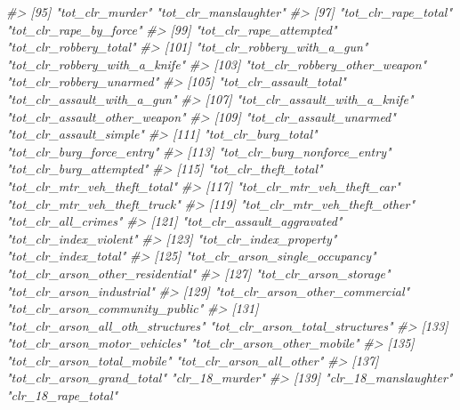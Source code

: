 \documentclass[
]{krantz}
\makeatletter
\newenvironment{Shaded}{\begin{snugshade}}{\end{snugshade}}
\newcommand{\CommentTok}[1]{\textcolor[rgb]{0.37,0.37,0.37}{\textit{#1}}}
\newenvironment{kframe}{%
\medskip{}
\setlength{\fboxsep}{.8em}
 \def\at@end@of@kframe{}%
 \ifinner\ifhmode%
  \def\at@end@of@kframe{\end{minipage}}%
  \begin{minipage}{\columnwidth}%
 \fi\fi%
 \def\FrameCommand##1{\hskip\@totalleftmargin \hskip-\fboxsep
 \colorbox{shadecolor}{##1}\hskip-\fboxsep
     \hskip-\linewidth \hskip-\@totalleftmargin \hskip\columnwidth}%
 \MakeFramed {\advance\hsize-\width
   \@totalleftmargin\z@ \linewidth\hsize
   \@setminipage}}%
 {\par\unskip\endMakeFramed%
 \at@end@of@kframe}
\renewenvironment{Shaded}{\begin{kframe}}{\end{kframe}}
\makeatother
\begin{document}
\begin{Shaded}
\begin{Highlighting}[]
\CommentTok{\#\textgreater{}  [95] "tot\_clr\_murder"                   "tot\_clr\_manslaughter"            }
\CommentTok{\#\textgreater{}  [97] "tot\_clr\_rape\_total"               "tot\_clr\_rape\_by\_force"           }
\CommentTok{\#\textgreater{}  [99] "tot\_clr\_rape\_attempted"           "tot\_clr\_robbery\_total"           }
\CommentTok{\#\textgreater{} [101] "tot\_clr\_robbery\_with\_a\_gun"       "tot\_clr\_robbery\_with\_a\_knife"    }
\CommentTok{\#\textgreater{} [103] "tot\_clr\_robbery\_other\_weapon"     "tot\_clr\_robbery\_unarmed"         }
\CommentTok{\#\textgreater{} [105] "tot\_clr\_assault\_total"            "tot\_clr\_assault\_with\_a\_gun"      }
\CommentTok{\#\textgreater{} [107] "tot\_clr\_assault\_with\_a\_knife"     "tot\_clr\_assault\_other\_weapon"    }
\CommentTok{\#\textgreater{} [109] "tot\_clr\_assault\_unarmed"          "tot\_clr\_assault\_simple"          }
\CommentTok{\#\textgreater{} [111] "tot\_clr\_burg\_total"               "tot\_clr\_burg\_force\_entry"        }
\CommentTok{\#\textgreater{} [113] "tot\_clr\_burg\_nonforce\_entry"      "tot\_clr\_burg\_attempted"          }
\CommentTok{\#\textgreater{} [115] "tot\_clr\_theft\_total"              "tot\_clr\_mtr\_veh\_theft\_total"     }
\CommentTok{\#\textgreater{} [117] "tot\_clr\_mtr\_veh\_theft\_car"        "tot\_clr\_mtr\_veh\_theft\_truck"     }
\CommentTok{\#\textgreater{} [119] "tot\_clr\_mtr\_veh\_theft\_other"      "tot\_clr\_all\_crimes"              }
\CommentTok{\#\textgreater{} [121] "tot\_clr\_assault\_aggravated"       "tot\_clr\_index\_violent"           }
\CommentTok{\#\textgreater{} [123] "tot\_clr\_index\_property"           "tot\_clr\_index\_total"             }
\CommentTok{\#\textgreater{} [125] "tot\_clr\_arson\_single\_occupancy"   "tot\_clr\_arson\_other\_residential" }
\CommentTok{\#\textgreater{} [127] "tot\_clr\_arson\_storage"            "tot\_clr\_arson\_industrial"        }
\CommentTok{\#\textgreater{} [129] "tot\_clr\_arson\_other\_commercial"   "tot\_clr\_arson\_community\_public"  }
\CommentTok{\#\textgreater{} [131] "tot\_clr\_arson\_all\_oth\_structures" "tot\_clr\_arson\_total\_structures"  }
\CommentTok{\#\textgreater{} [133] "tot\_clr\_arson\_motor\_vehicles"     "tot\_clr\_arson\_other\_mobile"      }
\CommentTok{\#\textgreater{} [135] "tot\_clr\_arson\_total\_mobile"       "tot\_clr\_arson\_all\_other"         }
\CommentTok{\#\textgreater{} [137] "tot\_clr\_arson\_grand\_total"        "clr\_18\_murder"                   }
\CommentTok{\#\textgreater{} [139] "clr\_18\_manslaughter"              "clr\_18\_rape\_total"               }

\end{Highlighting}
\end{Shaded}
\end{document}
